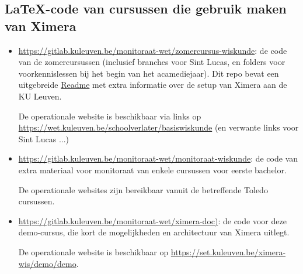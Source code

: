 \documentclass{ximera}
\begin{document}
\subsection{\LaTeX-code van cursussen die gebruik maken van Ximera}
\begin{itemize}
    \item \url{https://gitlab.kuleuven.be/monitoraat-wet/zomercursus-wiskunde}: de code van de zomercursussen (inclusief branches voor Sint Lucas, en folders voor voorkennislessen bij het begin van het acamediejaar). Dit repo bevat een uitgebreide \href{https://gitlab.kuleuven.be/monitoraat-wet/zomercursus-wiskunde/blob/master/Readme.md}{Readme} met extra informatie over de setup van Ximera aan de KU Leuven.
    
    De operationale website is beschikbaar via links op \url{https://wet.kuleuven.be/schoolverlater/basiswiskunde} (en verwante links voor Sint Lucas ...)
    
    

    \item \url{https://gitlab.kuleuven.be/monitoraat-wet/monitoraat-wiskunde}: de code van extra materiaal voor monitoraat van enkele cursussen voor eerste bachelor.
    
    De operationale websites zijn bereikbaar vanuit de betreffende Toledo cursussen.
    
    \item \url{https://gitlab.kuleuven.be/monitoraat-wet/ximera-doc)}: de code voor deze demo-cursus, die kort de mogelijkheden en architectuur van Ximera uitlegt.
    
    De operationale website is beschikbaar op \url{https://set.kuleuven.be/ximera-wis/demo/demo}.
\end{itemize}
\end{document}
